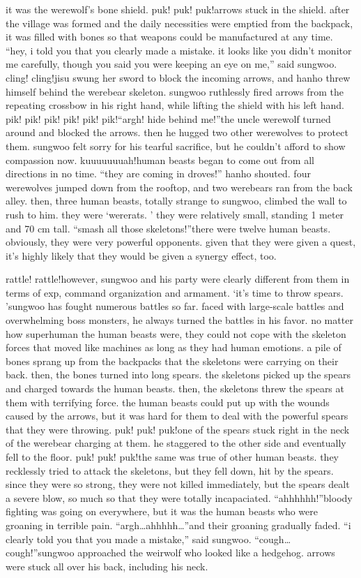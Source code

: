  it was the werewolf’s bone shield.
puk! puk! puk!arrows stuck in the shield.
 after the village was formed and the daily necessities were emptied from the backpack, it was filled with bones so that weapons could be manufactured at any time.
“hey, i told you that you clearly made a mistake.
 it looks like you didn’t monitor me carefully, though you said you were keeping an eye on me,” said sungwoo.
cling! cling!jisu swung her sword to block the incoming arrows, and hanho threw himself behind the werebear skeleton.
sungwoo ruthlessly fired arrows from the repeating crossbow in his right hand, while lifting the shield with his left hand.
pik! pik! pik! pik! pik! pik!“argh! hide behind me!”the uncle werewolf turned around and blocked the arrows.
 then he hugged two other werewolves to protect them.
 sungwoo felt sorry for his tearful sacrifice, but he couldn’t afford to show compassion now.
kuuuuuuuah!human beasts began to come out from all directions in no time.
“they are coming in droves!” hanho shouted.
four werewolves jumped down from the rooftop, and two werebears ran from the back alley.
 then, three human beasts, totally strange to sungwoo, climbed the wall to rush to him.
they were ‘wererats.
’ they were relatively small, standing 1 meter and 70 cm tall.
“smash all those skeletons!”there were twelve human beasts.
 obviously, they were very powerful opponents.
 given that they were given a quest, it’s highly likely that they would be given a synergy effect, too.


rattle! rattle!however, sungwoo and his party were clearly different from them in terms of exp, command organization and armament.
‘it’s time to throw spears.
’sungwoo has fought numerous battles so far.
 faced with large-scale battles and overwhelming boss monsters, he always turned the battles in his favor.
no matter how superhuman the human beasts were, they could not cope with the skeleton forces that moved like machines as long as they had human emotions.
a pile of bones sprang up from the backpacks that the skeletons were carrying on their back.
 then, the bones turned into long spears.
 the skeletons picked up the spears and charged towards the human beasts.
then, the skeletons threw the spears at them with terrifying force.
 the human beasts could put up with the wounds caused by the arrows, but it was hard for them to deal with the powerful spears that they were throwing.
puk! puk! puk!one of the spears stuck right in the neck of the werebear charging at them.
 he staggered to the other side and eventually fell to the floor.
puk! puk! puk!the same was true of other human beasts.
 they recklessly tried to attack the skeletons, but they fell down, hit by the spears.
 since they were so strong, they were not killed immediately, but the spears dealt a severe blow, so much so that they were totally incapaciated.
“ahhhhhh!”bloody fighting was going on everywhere, but it was the human beasts who were groaning in terrible pain.
“argh…ahhhhh…”and their groaning gradually faded.
“i clearly told you that you made a mistake,” said sungwoo.
“cough…cough!”sungwoo approached the weirwolf who looked like a hedgehog.
 arrows were stuck all over his back, including his neck.


 
